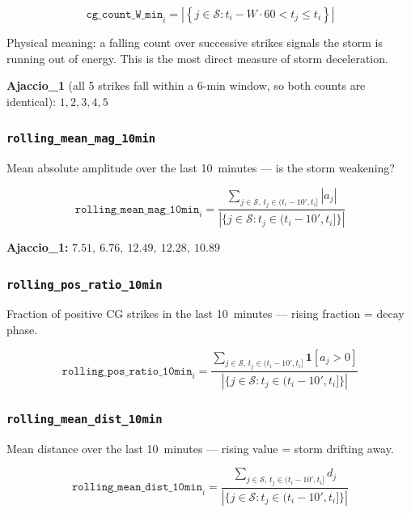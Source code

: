 \documentclass[12pt,a4paper]{article}
\newcommand{\feat}[1]{\texttt{\textbf{#1}}}
\begin{document}
\begin{formulabox}
\[
  \texttt{cg\_count\_W\_min}_i = \left|\left\{ j \in \mathcal{S} : t_i - W \cdot 60 < t_j \leq t_i \right\}\right|
\]
\end{formulabox}

Physical meaning: a falling count over successive strikes signals the storm is running out of energy. This is the most direct measure of storm deceleration.

\textbf{Ajaccio\_1} (all 5 strikes fall within a 6-min window, so both counts are identical): $1, 2, 3, 4, 5$

\subsubsection*{\feat{rolling\_mean\_mag\_10min}}

Mean absolute amplitude over the last 10~minutes --- is the storm weakening?

\begin{formulabox}
\[
  \texttt{rolling\_mean\_mag\_10min}_i
  = \frac{\sum_{j \in \mathcal{S},\, t_j \in (t_i - 10', t_i]} |a_j|}
         {\left|\{j \in \mathcal{S} : t_j \in (t_i - 10', t_i]\}\right|}
\]
\end{formulabox}

\textbf{Ajaccio\_1:} $7.51,\ 6.76,\ 12.49,\ 12.28,\ 10.89$

\subsubsection*{\feat{rolling\_pos\_ratio\_10min}}

Fraction of positive CG strikes in the last 10~minutes --- rising fraction = decay phase.

\begin{formulabox}
\[
  \texttt{rolling\_pos\_ratio\_10min}_i
  = \frac{\sum_{j \in \mathcal{S},\, t_j \in (t_i - 10', t_i]} \mathbf{1}[a_j > 0]}
         {\left|\{j \in \mathcal{S} : t_j \in (t_i - 10', t_i]\}\right|}
\]
\end{formulabox}

\subsubsection*{\feat{rolling\_mean\_dist\_10min}}

Mean distance over the last 10~minutes --- rising value = storm drifting away.

\begin{formulabox}
\[
  \texttt{rolling\_mean\_dist\_10min}_i
  = \frac{\sum_{j \in \mathcal{S},\, t_j \in (t_i - 10', t_i]} d_j}
         {\left|\{j \in \mathcal{S} : t_j \in (t_i - 10', t_i]\}\right|}
\]
\end{formulabox}
\end{document}
